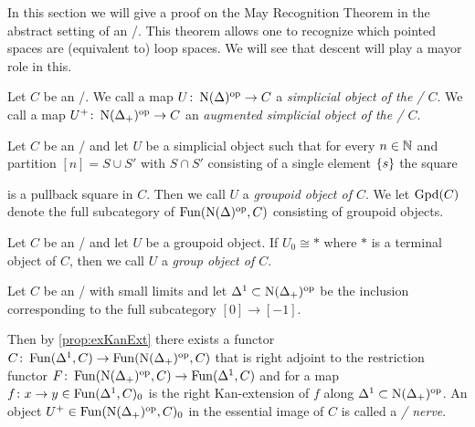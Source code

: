 In this section we will give a proof on the May Recognition Theorem in the abstract setting of an \inftytop/.
This theorem allows one to recognize which pointed spaces are (equivalent to) loop spaces.
We will see that descent will play a mayor role in this.
\begin{definition} %
    Let $C$ be an \inftycat/. 
    We call a map $U\colon\operatorname{N}(\Delta)^{\operatorname{op}}\to C$ a \emph{simplicial object of the \inftycat/ $C$}.
    We call a map $U^+\colon\operatorname{N}(\Delta_+)^{\operatorname{op}}\to C$ an \emph{augmented simplicial object of the \inftycat/ $C$}.
\end{definition}
\begin{definition}
    Let $C$ be an \inftycat/ and let $U$ be a simplicial object such that for every $n\in\mathbb{N}$ and partition $[n]=S\cup S'$ with $S\cap S'$ consisting of a single element $\left\lbrace s\right\rbrace$ the square
    \begin{center}
    \end{center}
    is a pullback square in $C$.
    Then we call $U$ a \emph{groupoid object of $C$}.
    We let $\operatorname{Gpd}(C)$ denote the full subcategory of $\operatorname{Fun}(\operatorname{N}(\Delta)^{\operatorname{op}},C)$ consisting of groupoid objects.
\end{definition}
\begin{definition}
    Let $C$ be an \inftycat/ and let $U$ be a groupoid object.
    If $U_0\cong *$ where $*$ is a terminal object of $C$, then we call $U$ a \emph{group object of $C$}.
\end{definition}
\begin{definition}
    Let $C$ be an \inftycat/ with small limits and let $\Delta^1\subset\operatorname{N}(\Delta_+)^{\operatorname{op}}$ be the inclusion corresponding to the full subcategory $[0]\to[-1]$.
    
    Then by \cref{prop:exKanExt} there exists a functor $C\colon\operatorname{Fun}(\Delta^1,C)\to\operatorname{Fun}(\operatorname{N}(\Delta_+)^{\operatorname{op}},C)$ that is right adjoint to the restriction functor $F\colon\operatorname{Fun}(\operatorname{N}(\Delta_+)^{\operatorname{op}},C)\to\operatorname{Fun}(\Delta^1,C)$ and for a map $f\colon x\to y\in\operatorname{Fun}(\Delta^1,C)_0$ is the right Kan-extension of $f$ along $\Delta^1\subset\operatorname{N}(\Delta_+)^{\operatorname{op}}$.
    An object $U^+\in\operatorname{Fun}(\operatorname{N}(\Delta_+)^{\operatorname{op}},C)_0$ in the essential image of $C$ is called a \emph{\Cech/ nerve}.
\end{definition}
